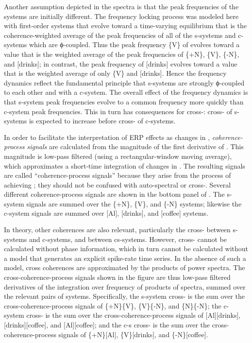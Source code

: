 Another assumption depicted in the spectra is that the peak frequencies of the systems are initially different. The frequency locking process was modeled here with first-order systems that evolve toward a time-varying equilibrium that is the coherence-weighted average of the peak frequencies of all of the s-systems and c-systems which are ϕ-coupled. Thus the peak frequency \{V\} of evolves toward a value that is the weighted average of the peak frequencies of \{+N\}, \{V\}, \{-N\}, and [drinks]; in contrast, the peak frequency of [drinks] evolves toward a value that is the weighted average of only \{V\} and [drinks]. Hence the frequency dynamics reflect the fundamental principle that s-systems are strongly ϕ-coupled to each other and  with a c-system. The overall effect of the frequency dynamics is that s-system peak frequencies evolve to a common frequency more quickly than c-system peak frequencies. This in turn has consequences for cross-: cross- of s-systems is expected to increase before cross- of c-systems.

  In order to facilitate the interpretation of ERP effects as changes in , \textit{coherence-process signals} are calculated from the magnitude of the first derivative of . This magnitude is low-pass filtered (using a rectangular-window moving average), which approximates a short-time integration of changes in . The resulting signals are called “coherence-process signals” because they arise from the process of achieving ; they should not be confused with auto-spectral or cross-. Several different coherence-process signals are shown in the bottom panel of {}. The s-system  signals are summed over the \{+N\}, \{V\}, and \{-N\} systems; likewise the c-system signals are summed over [Al], [drinks], and [coffee] systems. 
  
  In theory, other coherences are also relevant, particularly the cross- between s-systems and c-systems, and between cs-systems. However, cross- cannot be calculated without phase information, which in turn cannot be calculated without a model that generates an explicit spike-rate time series. In the absence of such a model, cross coherences are approximated by the products of power spectra. The cross-coherence-process signals shown in the figure are thus low-pass filtered derivatives of the integration over frequency of products of spectra, summed over the relevant pairs of systems. Specifically, the s-system cross- is the sum over the cross-coherence-process signals of \{+N\}\{V\}, \{V\}\{-N\}, and \{N\}\{-N\}; the c-system cross- is the sum over the cross-coherence-process signals of [Al][drinks], [drinks][coffee], and [Al][coffee]; and the c-s cross- is the sum over the cross-coherence-process signals of \{+N\}[Al], \{V\}[drinks], and \{-N\}[coffee]. 

